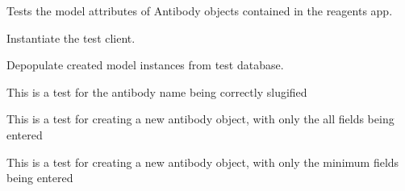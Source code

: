 \documentclass[letterpaper,10pt,english]{sphinxmanual}
\begin{document}
\begin{fulllineitems}
\label{api:experimentdb.reagents.tests.AntibodyModelTests}
Tests the model attributes of Antibody objects contained in the reagents app.


\begin{fulllineitems}
\label{api:experimentdb.reagents.tests.AntibodyModelTests.setUp}
Instantiate the test client.


\end{fulllineitems}


\begin{fulllineitems}
\label{api:experimentdb.reagents.tests.AntibodyModelTests.tearDown}
Depopulate created model instances from test database.


\end{fulllineitems}


\begin{fulllineitems}
\label{api:experimentdb.reagents.tests.AntibodyModelTests.test_antibody_slugify}
This is a test for the antibody name being correctly slugified


\end{fulllineitems}


\begin{fulllineitems}
\label{api:experimentdb.reagents.tests.AntibodyModelTests.test_create_antibody_all_fields}
This is a test for creating a new antibody object, with only the all fields being entered


\end{fulllineitems}


\begin{fulllineitems}
\label{api:experimentdb.reagents.tests.AntibodyModelTests.test_create_antibody_minimal}
This is a test for creating a new antibody object, with only the minimum fields being entered


\end{fulllineitems}


\end{fulllineitems}
\end{document}
